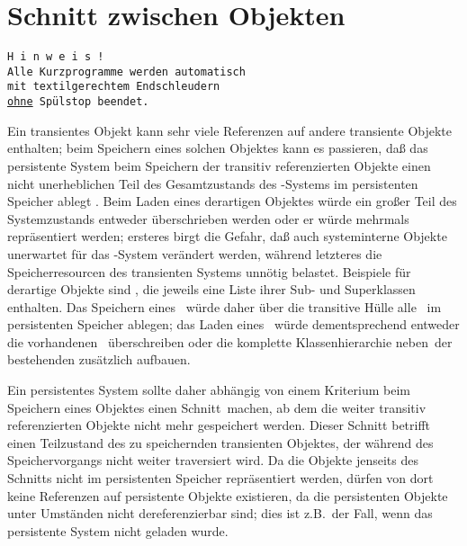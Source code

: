 \section{Schnitt zwischen Objekten}\label{sec:cut}
%
\begin{fortune}[8cm]
{\tt H\ i\ n\ w\ e\ i\ s\ !\\[\smallskipamount]
Alle Kurzprogramme werden automatisch\\
mit textilgerechtem Endschleudern\\
\underline{ohne}\ Sp\"{u}lstop beendet.}
\end{fortune}
%
Ein transientes Objekt kann sehr viele Referenzen auf andere
transiente Objekte enthalten; beim Speichern eines solchen Objektes
kann es passieren, da\ss{} das persistente System beim Speichern der
transitiv referenzierten Objekte einen nicht unerheblichen Teil des
Gesamtzustands des \cl-Systems im persistenten Speicher ablegt
\cite[]{bib:fo88}.
Beim Laden eines derartigen Objektes w\"{u}rde ein gro\ss{}er Teil
des Systemzustands entweder \"{u}berschrieben werden oder er w\"{u}rde
mehrmals repr\"{a}sentiert werden; ersteres birgt die Gefahr, da\ss{} auch
systeminterne Objekte unerwartet f\"{u}r das \cl-System ver\"{a}ndert
werden, w\"{a}hrend letzteres die Speicherresourcen des transienten
Systems unn\"{o}tig belastet. Beispiele f\"{u}r derartige Objekte sind
\clsmo[e], die jeweils eine Liste ihrer Sub- und Superklassen
enthalten. Das Speichern eines \clsmo[es]\ w\"{u}rde daher \"{u}ber die
transitive H\"{u}lle alle \clsmo[e]\ im persistenten Speicher ablegen;
das Laden eines \clsmo[es]\ w\"{u}rde dementsprechend entweder die
vorhandenen \clsmo[e]\ \"{u}berschreiben oder die komplette
Klassenhierarchie \rglq{}neben\rgrq\ der bestehenden zus\"{a}tzlich
aufbauen.
%
\par{}Ein persistentes System sollte daher abh\"{a}ngig von einem
Kriterium beim Speichern eines Objektes einen
\rglq{}Schnitt\rgrq\ machen, ab dem die weiter transitiv referenzierten
Objekte nicht mehr gespeichert werden.
Dieser Schnitt betrifft einen Teilzustand des zu speichernden
transienten Objektes, der w\"{a}hrend des Speichervorgangs nicht weiter
traversiert wird. Da die Objekte jenseits des
Schnitts nicht im persistenten Speicher repr\"{a}sentiert werden, d\"{u}rfen
von dort keine Referenzen auf persistente Objekte existieren, da die
persistenten Objekte unter Umst\"{a}nden nicht dereferenzierbar sind; dies
ist z.B.\ der Fall, wenn das persistente System nicht geladen wurde.
%
